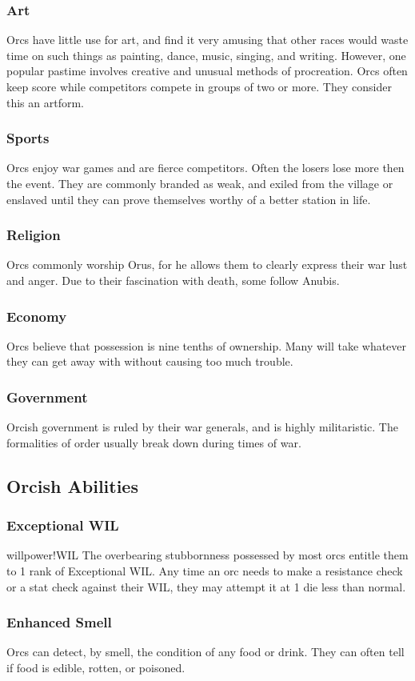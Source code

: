 \begin{multicols*}{2}
\subsubsection{Art}
Orcs have little use for art, and find it very amusing that other races would waste time on such things as painting, dance, music, singing, and writing. However, one popular pastime involves creative and unusual methods of procreation. Orcs often keep score while competitors compete in groups of two or more. They consider this an artform.
\subsubsection{Sports}
Orcs enjoy war games and are fierce competitors. Often the losers lose more then the event. They are commonly branded as weak, and exiled from the village or enslaved until they can prove themselves worthy of a better station in life.
\subsubsection{Religion}
Orcs commonly worship Orus, for he allows them to clearly express their war lust and anger. Due to their fascination with death, some follow Anubis.
\subsubsection{Economy}
Orcs believe that possession is nine tenths of ownership. Many will take whatever they can get away with without causing too much trouble.
\subsubsection{Government}
Orcish government is ruled by their war generals, and is highly militaristic. The formalities of order usually break down during times of war.
\subsection{Orcish Abilities}
\subsubsection{Exceptional WIL}
{willpower!WIL}
The overbearing stubbornness possessed by most orcs entitle them to 1 rank of Exceptional WIL. Any time an orc needs to make a resistance check or a stat check against
their WIL, they may attempt it at 1 die less than normal.
\subsubsection{Enhanced Smell}
Orcs can detect, by smell, the condition of any food or drink. They can often tell if food is edible, rotten, or poisoned.

\end{multicols*}
